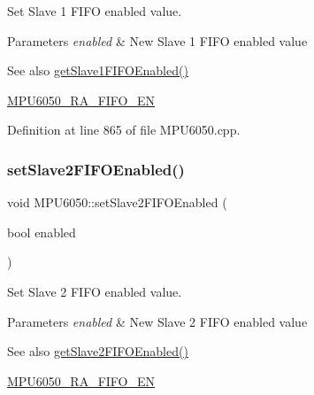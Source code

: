 Set Slave 1 F\+I\+FO enabled value. 
\begin{DoxyParams}{Parameters}
{\em enabled} & New Slave 1 F\+I\+FO enabled value \\
\hline
\end{DoxyParams}
\begin{DoxySeeAlso}{See also}
\mbox{\hyperlink{classMPU6050_afd6a9b55a589c83c9a0fb0b5b2a88234}{get\+Slave1\+F\+I\+F\+O\+Enabled()}} 

\mbox{\hyperlink{MPU6050_8h_a1166fe50f4792f3266e15dc3273e375d}{M\+P\+U6050\+\_\+\+R\+A\+\_\+\+F\+I\+F\+O\+\_\+\+EN}} 
\end{DoxySeeAlso}


Definition at line 865 of file M\+P\+U6050.\+cpp.


\begin{DoxyCode}{0}

\end{DoxyCode}
\mbox{\label{classMPU6050_a38a10ac4f30b96718ec021dc0db8587b}} 
\subsubsection{\texorpdfstring{setSlave2FIFOEnabled()}{setSlave2FIFOEnabled()}}
{\footnotesize\ttfamily void M\+P\+U6050\+::set\+Slave2\+F\+I\+F\+O\+Enabled (\begin{DoxyParamCaption}\item[{bool}]{enabled }\end{DoxyParamCaption})}

Set Slave 2 F\+I\+FO enabled value. 
\begin{DoxyParams}{Parameters}
{\em enabled} & New Slave 2 F\+I\+FO enabled value \\
\hline
\end{DoxyParams}
\begin{DoxySeeAlso}{See also}
\mbox{\hyperlink{classMPU6050_a3c2e29508607a655221a2fa4f4219b4d}{get\+Slave2\+F\+I\+F\+O\+Enabled()}} 

\mbox{\hyperlink{MPU6050_8h_a1166fe50f4792f3266e15dc3273e375d}{M\+P\+U6050\+\_\+\+R\+A\+\_\+\+F\+I\+F\+O\+\_\+\+EN}} 
\end{DoxySeeAlso}


